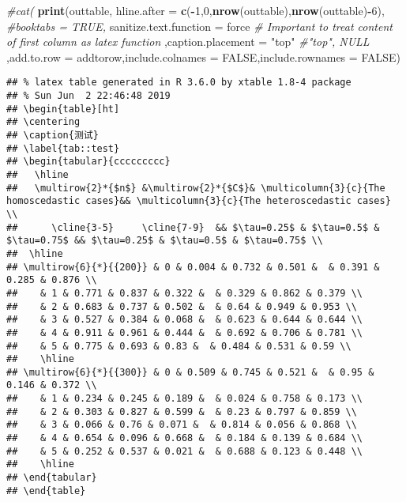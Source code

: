 \documentclass[]{ctexbook}
\newenvironment{Shaded}{\begin{snugshade}}{\end{snugshade}}
\newcommand{\CommentTok}[1]{\textcolor[rgb]{0.56,0.35,0.01}{\textit{#1}}}
\newcommand{\DataTypeTok}[1]{\textcolor[rgb]{0.13,0.29,0.53}{#1}}
\newcommand{\DecValTok}[1]{\textcolor[rgb]{0.00,0.00,0.81}{#1}}
\newcommand{\KeywordTok}[1]{\textcolor[rgb]{0.13,0.29,0.53}{\textbf{#1}}}
\newcommand{\NormalTok}[1]{#1}
\newcommand{\OperatorTok}[1]{\textcolor[rgb]{0.81,0.36,0.00}{\textbf{#1}}}
\newcommand{\OtherTok}[1]{\textcolor[rgb]{0.56,0.35,0.01}{#1}}
\newcommand{\StringTok}[1]{\textcolor[rgb]{0.31,0.60,0.02}{#1}}
\begin{document}
\begin{Shaded}
\begin{Highlighting}[]
\CommentTok{#cat(}
  \KeywordTok{print}\NormalTok{(outtable,}
          \DataTypeTok{hline.after =} \KeywordTok{c}\NormalTok{(}\OperatorTok{-}\DecValTok{1}\NormalTok{,}\DecValTok{0}\NormalTok{,}\KeywordTok{nrow}\NormalTok{(outtable),}\KeywordTok{nrow}\NormalTok{(outtable)}\OperatorTok{-}\DecValTok{6}\NormalTok{),}
          \CommentTok{#booktabs = TRUE,}
          \DataTypeTok{sanitize.text.function =}\NormalTok{ force }\CommentTok{# Important to treat content of first column as latex function}
\NormalTok{          ,}\DataTypeTok{caption.placement =} \StringTok{"top"} \CommentTok{#"top", NULL}
\NormalTok{          ,}\DataTypeTok{add.to.row =}\NormalTok{ addtorow,}\DataTypeTok{include.colnames =} \OtherTok{FALSE}\NormalTok{,}\DataTypeTok{include.rownames =} \OtherTok{FALSE}\NormalTok{)}
\end{Highlighting}
\end{Shaded}

\begin{verbatim}
## % latex table generated in R 3.6.0 by xtable 1.8-4 package
## % Sun Jun  2 22:46:48 2019
## \begin{table}[ht]
## \centering
## \caption{测试} 
## \label{tab::test}
## \begin{tabular}{ccccccccc}
##   \hline
##   \multirow{2}*{$n$} &\multirow{2}*{$C$}& \multicolumn{3}{c}{The homoscedastic cases}&& \multicolumn{3}{c}{The heteroscedastic cases} \\
##      \cline{3-5}     \cline{7-9}  && $\tau=0.25$ & $\tau=0.5$ & $\tau=0.75$ && $\tau=0.25$ & $\tau=0.5$ & $\tau=0.75$ \\
##  \hline
## \multirow{6}{*}{{200}} & 0 & 0.004 & 0.732 & 0.501 &  & 0.391 & 0.285 & 0.876 \\ 
##    & 1 & 0.771 & 0.837 & 0.322 &  & 0.329 & 0.862 & 0.379 \\ 
##    & 2 & 0.683 & 0.737 & 0.502 &  & 0.64 & 0.949 & 0.953 \\ 
##    & 3 & 0.527 & 0.384 & 0.068 &  & 0.623 & 0.644 & 0.644 \\ 
##    & 4 & 0.911 & 0.961 & 0.444 &  & 0.692 & 0.706 & 0.781 \\ 
##    & 5 & 0.775 & 0.693 & 0.83 &  & 0.484 & 0.531 & 0.59 \\ 
##    \hline
## \multirow{6}{*}{{300}} & 0 & 0.509 & 0.745 & 0.521 &  & 0.95 & 0.146 & 0.372 \\ 
##    & 1 & 0.234 & 0.245 & 0.189 &  & 0.024 & 0.758 & 0.173 \\ 
##    & 2 & 0.303 & 0.827 & 0.599 &  & 0.23 & 0.797 & 0.859 \\ 
##    & 3 & 0.066 & 0.76 & 0.071 &  & 0.814 & 0.056 & 0.868 \\ 
##    & 4 & 0.654 & 0.096 & 0.668 &  & 0.184 & 0.139 & 0.684 \\ 
##    & 5 & 0.252 & 0.537 & 0.021 &  & 0.688 & 0.123 & 0.448 \\ 
##    \hline
## \end{tabular}
## \end{table}
\end{verbatim}
\end{document}

